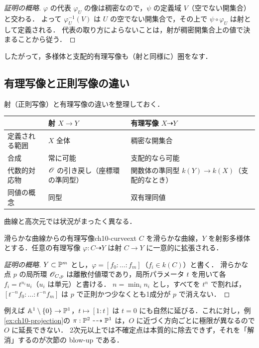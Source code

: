 \begin{proof}[証明の概略]
$\varphi$ の代表 $\varphi_U$ の像は稠密なので，$\psi$ の定義域 $V$（空でない開集合）と交わる．
よって $\varphi_U^{-1}(V)$ は $U$ の空でない開集合で，その上で $\psi\circ\varphi_U$ は射として定義される．
代表の取り方によらないことは，射が稠密開集合上の値で決まることから従う．
\end{proof}

したがって，多様体と支配的有理写像も（射と同様に）圏をなす．

\subsection{有理写像と正則写像の違い}

射（正則写像）と有理写像の違いを整理しておく．

\begin{center}
\renewcommand{\arraystretch}{1.3}
\begin{tabular}{p{}p{}p{}}
\hline
 & 射 $X\to Y$ & 有理写像 $X\dashrightarrow Y$ \\
\hline
定義される範囲 & $X$ 全体 & 稠密な開集合 \\
合成 & 常に可能 & 支配的なら可能 \\
代数的対応物 & $\mathscr{O}$ の引き戻し（座標環の準同型） & 関数体の準同型 $k(Y)\to k(X)$（支配的なとき） \\
同値の概念 & 同型 & 双有理同値 \\
\hline
\end{tabular}
\end{center}

曲線と高次元では状況がまったく異なる．

\begin{myprop}{滑らかな曲線からの有理写像}{ch10-curveext}
$C$ を滑らかな曲線，$Y$ を射影多様体とする．任意の有理写像 $\varphi:C\dashrightarrow Y$ は射 $C\to Y$ に一意的に拡張される．
\end{myprop}

\begin{proof}[証明の概略]
$Y\subset\mathbb{P}^m$ とし，$\varphi=[f_0:\dots:f_m]$（$f_i\in k(C)$）と書く．
滑らかな点 $p$ の局所環 $\mathscr{O}_{C,p}$ は離散付値環であり，局所パラメータ $t$ を用いて各 $f_i=t^{n_i}u_i$（$u_i$ は単元）と書ける．
$n=\min_in_i$ とし，すべてを $t^{n}$ で割れば，$[t^{-n}f_0:\dots:t^{-n}f_m]$ は $p$ で正則かつ少なくとも1成分が $p$ で消えない．
\end{proof}

例えば $\mathbb{A}^1\setminus\{0\}\to\mathbb{P}^1$，$t\mapsto[1:t]$ は $t=0$ にも自然に延びる．これに対し，例\ref{ex:ch10-projection}の $\pi:\mathbb{P}^2\dashrightarrow\mathbb{P}^1$ は，$O$ に近づく方向ごとに極限が異なるので $O$ に延長できない．
2次元以上では不確定点は本質的に除去できず，それを「解消」するのが次節の blow-up である．

